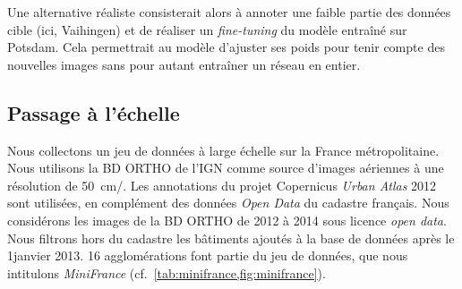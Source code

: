 
Une alternative réaliste consisterait alors à annoter une faible partie des données cible (ici, Vaihingen) et de réaliser un \emph{fine-tuning} du modèle entraîné sur Potsdam. Cela permettrait au modèle d'ajuster ses poids pour tenir compte des nouvelles images sans pour autant entraîner un réseau en entier.


\subsection{Passage à l'échelle}

Nous collectons un jeu de données à large échelle sur la France métropolitaine. Nous utilisons la BD ORTHO de l'\gls{IGN} comme source d'images aériennes à une résolution de \SI{50}{\centi\meter/\px}. Les annotations du projet Copernicus \emph{Urban Atlas} 2012 sont utilisées, en complément des données \emph{Open Data} du cadastre français. Nous considérons les images de la BD ORTHO de 2012 à 2014 sous licence \emph{open data}. Nous filtrons hors du cadastre les bâtiments ajoutés à la base de données après le 1\ier janvier 2013. 16 agglomérations font partie du jeu de données, que nous intitulons \emph{MiniFrance} (cf.~\cref{tab:minifrance,fig:minifrance}).

